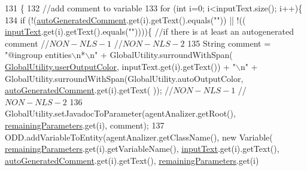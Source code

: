 \begin{DoxyCode}
131                                     \{ 
132         \textcolor{comment}{//add comment to variable}
133         \textcolor{keywordflow}{for} (\textcolor{keywordtype}{int} i=0; i<inputText.size(); i++)\{
134             \textcolor{keywordflow}{if} (!(\hyperlink{classit_1_1isislab_1_1masonhelperdocumentation_1_1mason_1_1wizards_1_1_f___agent_variables_page_a40035836d72bb86df98d0bb6035afb91}{autoGeneratedComment}.get(i).getText().equals(\textcolor{stringliteral}{""})) || !((
      \hyperlink{classit_1_1isislab_1_1masonhelperdocumentation_1_1mason_1_1wizards_1_1_f___agent_variables_page_a56e56862c30449ec5c07b8ac33d3b19f}{inputText}.get(i).getText().equals(\textcolor{stringliteral}{""}))))\{  \textcolor{comment}{//if there is at least an autogenerated comment
       //$NON-NLS-1$ //$NON-NLS-2$}
135                 String comment = \textcolor{stringliteral}{"@ingroup entities\(\backslash\)n*\(\backslash\)n"} + GlobalUtility.surroundWithSpan(
      \hyperlink{classit_1_1isislab_1_1masonhelperdocumentation_1_1analizer_1_1_global_utility_aec864cd710b27ece609c5a6093211ff4}{GlobalUtility.userOutputColor}, inputText.get(i).getText()) + \textcolor{stringliteral}{"\(\backslash\)n"} + 
      GlobalUtility.surroundWithSpan(GlobalUtility.autoOutputColor, \hyperlink{classit_1_1isislab_1_1masonhelperdocumentation_1_1mason_1_1wizards_1_1_f___agent_variables_page_a40035836d72bb86df98d0bb6035afb91}{autoGeneratedComment}.get(i).getText(
      )); \textcolor{comment}{//$NON-NLS-1$ //$NON-NLS-2$}
136                 GlobalUtility.setJavadocToParameter(agentAnalizer.getRoot(), 
      \hyperlink{classit_1_1isislab_1_1masonhelperdocumentation_1_1mason_1_1wizards_1_1_f___agent_variables_page_ade36fab1c0254d3ac94c077a06fb75f2}{remainingParameters}.get(i), comment);
137                 ODD.addVariableToEntity(agentAnalizer.getClassName(), \textcolor{keyword}{new} Variable(
      \hyperlink{classit_1_1isislab_1_1masonhelperdocumentation_1_1mason_1_1wizards_1_1_f___agent_variables_page_ade36fab1c0254d3ac94c077a06fb75f2}{remainingParameters}.get(i).getVariableName(), \hyperlink{classit_1_1isislab_1_1masonhelperdocumentation_1_1mason_1_1wizards_1_1_f___agent_variables_page_a56e56862c30449ec5c07b8ac33d3b19f}{inputText}.get(i).getText(), 
      \hyperlink{classit_1_1isislab_1_1masonhelperdocumentation_1_1mason_1_1wizards_1_1_f___agent_variables_page_a40035836d72bb86df98d0bb6035afb91}{autoGeneratedComment}.get(i).getText(), \hyperlink{classit_1_1isislab_1_1masonhelperdocumentation_1_1mason_1_1wizards_1_1_f___agent_variables_page_ade36fab1c0254d3ac94c077a06fb75f2}{remainingParameters}.get(i)

\end{DoxyCode}
